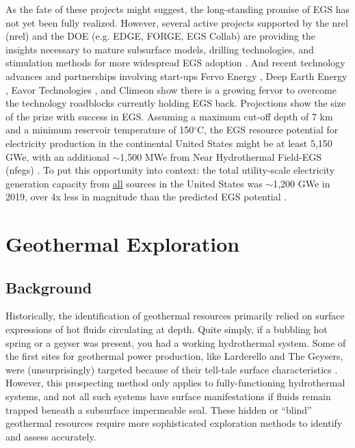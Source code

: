 As the fate of these projects might suggest, the long-standing promise of EGS has not yet been fully realized. However, several active projects supported by the \acrlong{nrel} (\acrshort{nrel}) and the DOE (e.g. EDGE, FORGE, EGS Collab) are providing the insights necessary to mature subsurface models, drilling technologies, and stimulation methods for more widespread EGS adoption \citep{hamm_geothermal_2021}. And recent technology advances and partnerships involving start-ups Fervo Energy \citep{moss_google_2021,shieber_geothermal_2021}, Deep Earth Energy \citep{geoenergy_saskatchewan_2021}, Eavor Technologies \citep{ross_energy_2020}, and Climeon \citep{climeon_climeon_2021,geoenergy_baseload_2020} show there is a growing fervor to overcome the technology roadblocks currently holding EGS back. Projections show the size of the prize with success in EGS. Assuming a maximum cut-off depth of 7 km and a minimum reservoir temperature of 150$^\circ$C, the EGS resource potential for electricity production in the continental United States might be at least 5,150 GWe, with an additional $\sim$1,500 MWe from Near Hydrothermal Field-EGS (\acrshort{nfegs}) \citep{augustine_geovision_2019}. To put this opportunity into context: the total utility-scale electricity generation capacity from \underline{all} sources in the United States was $\sim$1,200 GWe in 2019, over 4x less in magnitude than the predicted EGS potential \citep{eia_electric_2020}.

\section{Geothermal Exploration}\label{ch2:geoexp}
\subsection{Background}
Historically, the identification of geothermal resources primarily relied on surface expressions of hot fluids circulating at depth. Quite simply, if a bubbling hot spring or a geyser was present, you had a working hydrothermal system. Some of the first sites for geothermal power production, like Larderello and The Geysers, were (unsurprisingly) targeted because of their tell-tale surface characteristics \citep[p.\ 111]{glassley_geothermal_2015}. However, this prospecting method only applies to fully-functioning hydrothermal systems, and not all such systems have surface manifestations if fluids remain trapped beneath a subsurface impermeable seal. These hidden or “blind” geothermal resources require more sophisticated exploration methods to identify and assess accurately.

